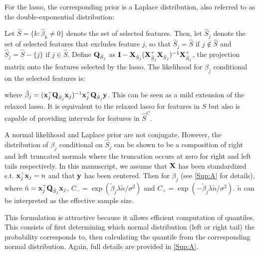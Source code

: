 For the lasso, the corresponding prior is a Laplace distribution, also referred to as the double-exponential distribution:

Let $\hat{S} = \lbrace k: \hat{\beta}_k \neq  0 \rbrace$ denote the set of selected features. Then, let $\hat{S}_j$ denote the set of selected features that excludes feature $j$, so that $\hat{S}_j = \hat{S} \text{ if } j \notin \hat{S}$ and $\hat{S}_j = \hat{S} - \lbrace j \rbrace \text{ if } j \in \hat{S}$. Define $\mathbf{Q}_{\hat{S}_j}$ as $\mathbf{I} - \mathbf{X}_{\hat{S}_j}(\mathbf{X}_{\hat{S}_j} ^{\scriptscriptstyle\top} \mathbf{X}_{\hat{S}_j})^{-1} \mathbf{X}_{\hat{S}_j} ^{\scriptscriptstyle\top}$, the projection matrix onto the features selected by the lasso. The likelihood for $\beta_j$ conditional on the selected features is:

\noindent where $\tilde{\beta}_j = (\mathbf{x}_j ^{\scriptscriptstyle\top} \mathbf{Q}_{\hat{S}_j} \mathbf{x}_j)^{-1} \mathbf{x}_j ^{\scriptscriptstyle\top} \mathbf{Q}_{\hat{S}_j} \mathbf{y}$.  This can be seen as a mild extension of the relaxed lasso. It is equivalent to the relaxed lasso for features in $\hat{S}$ but also is capable of providing intervals for features in $\hat{S}^C$.

A normal likelihood and Laplace prior are not conjugate. However, the distribution of $\beta_j$ conditional on $\hat{S}_j $ can be shown to be a composition of right and left truncated normals where the truncation occurs at zero for right and left tails respectively. In this manuscript, we assume that $\mathbf{X}$ has been standardized s.t. $\mathbf{x}_j ^{\scriptscriptstyle\top}\mathbf{x}_j = n$ and that $\mathbf{y}$ has been centered. Then for $\beta_j$ (see \ref{Sup:A} for details),
where $\tilde{n} = \mathbf{x}_j ^{\scriptscriptstyle\top} \mathbf{Q}_{\hat{S}_j} \mathbf{x}_j$, $C_{-} = \exp(\tilde{\beta}_j \lambda \tilde{n}/\sigma^2)$ and $C_{+} = \exp(-\tilde{\beta}_j \lambda \tilde{n}/\sigma^2)$. $\tilde{n}$ can be interpreted as the effective sample size.

This formulation is attractive because it allows efficient computation of quantiles. This consists of first determining which normal distribution (left or right tail) the probability corresponds to, then calculating the quantile from the corresponding normal distribution. Again, full details are provided in \ref{Sup:A}.

